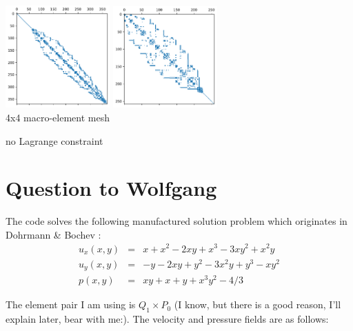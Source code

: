 \documentclass[a4paper]{article}
\begin{document}
\begin{center}
\includegraphics[width=4cm]{../results/spy/A_aft_topo6.pdf}
\includegraphics[width=4cm]{../results/spy/A_aft_topo7.pdf}\\
{\small 4x4 macro-element mesh}
\end{center}







no Lagrange constraint










\newpage
\section{Question to Wolfgang}

The code solves the following manufactured solution problem
which originates in Dohrmann \& Bochev \cite{dobo04}: 
\begin{eqnarray}
u_x(x,y) &=& x+x^2 - 2xy+x^3 - 3xy^2 + x^2y \\
u_y(x,y) &=& -y-2xy+y^2 -3x^2y + y^3 - xy^2 \\
p(x,y) &=& xy+x+y+x^3y^2 - 4/3
\end{eqnarray}

The element pair I am using is $Q_1\times P_0$ (I know, but there is a good reason, I'll 
explain later, bear with me:).
The velocity and pressure fields are as follows:
\end{document}
